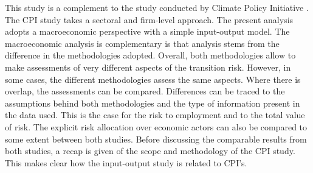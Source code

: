 \documentclass[12pt,english]{article}
\begin{document}
This study is a complement to the study conducted by Climate Policy Initiative \citep{CPI2019SA}. The CPI study takes a sectoral and firm-level approach. The present analysis adopts a macroeconomic perspective with a simple input-output model. The macroeconomic analysis is complementary is that analysis stems from the difference in the methodologies adopted. Overall, both methodologies allow to make assessments of very different aspects of the transition risk. However, in some cases, the different methodologies assess the same aspects. %
Where there is overlap, the assessments can be compared. Differences can be traced to the assumptions behind both methodologies and the type of information present in the data used. This is the case for the risk %
to employment and to the total value of risk. The explicit risk allocation over economic actors can also be compared to some extent between both studies. %
Before discussing the comparable results from both studies, a recap is given of the scope and methodology of the CPI study. This makes clear how the input-output study is related to CPI's. 
\end{document}
